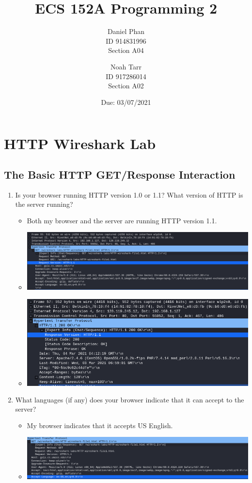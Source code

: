 \documentclass[11pt]{article}
\title{ECS 152A Programming 2}
\author{
  Daniel Phan \\
  ID 914831996 \\
  Section A04
  \and
  Noah Tarr \\
  ID 917286014 \\
  Section A02
}
\date{Due: 03/07/2021}
\begin{document}
\maketitle

\section{HTTP Wireshark Lab}

\subsection{The Basic HTTP GET/Response Interaction}

\begin{enumerate}
\item Is your browser running HTTP version 1.0 or 1.1?  What version of HTTP is
  the server running?
  \begin{itemize}
  \item Both my browser and the server are running HTTP version 1.1.
  \item \includegraphics[width=\textwidth]{img/ws-browser-http-version}
  \item \includegraphics[width=\textwidth]{img/ws-server-http-version}
  \end{itemize}
\item What languages (if any) does your browser indicate that it can accept to
  the server?
  \begin{itemize}
  \item My browser indicates that it accepts US English.
  \item \includegraphics[width=\textwidth]{img/ws-browser-language}

\end{itemize}
\end{enumerate}
\end{document}
